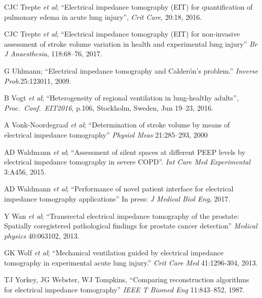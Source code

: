 \documentclass[10pt,journal]{IEEEtran}\def\TBLWIDA{15mm}\def\TBLWIDB{60mm}
\newcommand{\ifmaxthree}[2]{#2 {\em et al}; }
\begin{document}
\begin{thebibliography}{00}
\ifmaxthree{
CJC Trepte, CR Phillips, J Solà, A Adler, SA Haas, M Rapin; SH Böhm, DA Reuter
}{
CJC Trepte
}
``Electrical impedance tomography (EIT) for quantification of pulmonary edema in acute lung injury'',
{\em Crit Care},  20:18, 2016.

\ifmaxthree{
CJC Trepte, C Phillips, J Solà, A Adler, B Saugel, S Haas, SH Böhm, DA Reuter
}{
CJC Trepte}
``Electrical impedance tomography (EIT) for non-invasive assessment of stroke volume variation in health and experimental lung injury''
{\em Br J Anaesthesia}, 118:68--76, 2017.

G Uhlmann;
``Electrical impedance tomography and Calderón's problem.''
{\em  Inverse Prob}.25:123011, 2009.

\ifmaxthree{
B Vogt, K Ehlers, V Hennig, Z Zhao, N Weiler, I Frerichs;
}{
B Vogt
}
``Heterogeneity of regional ventilation in lung-healthy adults'',
{\em Proc.~Conf.~EIT2016}, p.106, 
Stockholm, Sweden, Jun 19--23, 2016.

\ifmaxthree{
A Vonk-Noordegraaf, A Janse, JT Marcus, JGF Bronzwaer, PE Postmus, TJC Faes, PMJM de Vries,
}{
A Vonk-Noordegraaf
}
``Determination of stroke volume by means of electrical impedance tomography''
{\em Physiol Meas} 21:285--293, 2000 

\ifmaxthree{
AD Waldmann, PL Róka, SH Böhm, W Windisch, S Strassmann, C Karagiannidis.
}{
AD Waldmann
}
``Assessment of silent spaces at different PEEP levels by electrical impedance tomography in severe COPD''.
{\em Int Care Med Experimental} 3:A456, 2015.

\ifmaxthree{
AD Waldmann, KH Wodack, A März, A Ukere,
CJ Trepte, SH Böhm, DA Reuter
}{
AD Waldmann
}
``Performance of novel patient interface for electrical impedance
tomography applications''
In press: {\em J Medical Biol Eng}, 2017.

\ifmaxthree{
Y Wan, A Borsic, J Heaney, J Seigne, A Schned, M Baker, S Wason, A Hartov, R Halter
}{
Y Wan
}
``Transrectal electrical impedance tomography of the prostate: Spatially coregistered pathological findings for prostate cancer detection''
{\em Medical physics} 40:063102, 2013.

\ifmaxthree{
GK Wolf, C Gómez-Laberge, JS Rettig, SO Vargas, CD Smallwood, SP Prabhu, SH Vitali, D Zurakowski, JH Arnold
}{
GK Wolf
}
``Mechanical ventilation guided by electrical impedance tomography in experimental acute lung injury.''
{\em Crit Care Med} 41:1296-304, 2013. %

TJ Yorkey, JG Webster, WJ Tompkins,
``Comparing reconstruction algorithms for electrical impedance tomography''
{\em  IEEE T Biomed Eng} 11:843--852, 1987.

\end{thebibliography}
\end{document}
